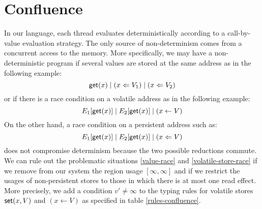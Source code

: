 \documentclass[11pt]{article}
\newcommand{\st}[2]{{\sf set}(#1,#2)}
\newcommand{\get}[1]{{\sf get}(#1)}
\newcommand{\store}[2]{(#1 \leftarrow #2)}
\newcommand{\pstore}[2]{(#1 \Leftarrow #2)}
\newcommand{\upair}[2]{[#1,#2]}
\begin{document}
\section{Confluence}\label{confluence-sec}
In our language, each thread evaluates deterministically
according to a call-by-value evaluation strategy.
The only source of non-determinism comes from a concurrent
access to the memory. More specifically, we may have a non-deterministic
program if several values are stored at the same address as in the following
example:
\begin{equation}\label{value-race}
\get{x} \mid \pstore{x}{V_1} \mid \pstore{x}{V_2}
\end{equation}
or if there is a race condition on a volatile address as in the following
example:
\begin{equation}\label{volatile-store-race}
E_1[\get{x}] \mid E_2[\get{x}] \mid \store{x}{V}
\end{equation}
On the other hand, a race condition on a persistent address such as:
\begin{equation}\label{persistent-store-race}
E_1[\get{x}] \mid E_2[\get{x}] \mid \pstore{x}{V}
\end{equation}
does not compromise determinism because the two possible reductions commute.
We can rule out the problematic situations \ref{value-race} and \ref{volatile-store-race} 
if we remove from our system the region usage $\upair{\infty}{\infty}$ and if we restrict
the usages of non-persistent stores to those 
in which there is at most one read effect.
More precisely, we add a condition $v'\neq \infty$ to the typing rules
for volatile stores $\st{x}{V}$ and $\store{x}{V}$ as specified in
table \ref{rules-confluence}.  
\end{document}
